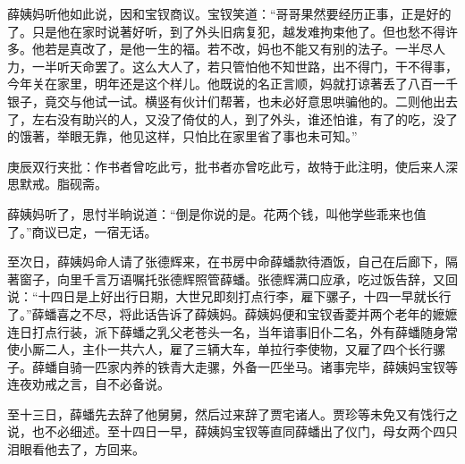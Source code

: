 \begin{parag}
    薛姨妈听他如此说，因和宝钗商议。宝钗笑道：“哥哥果然要经历正事，正是好的了。只是他在家时说著好听，到了外头旧病复犯，越发难拘束他了。但也愁不得许多。他若是真改了，是他一生的福。若不改，妈也不能又有别的法子。一半尽人力，一半听天命罢了。这么大人了，若只管怕他不知世路，出不得门，干不得事，今年关在家里，明年还是这个样儿。他既说的名正言顺，妈就打谅著丢了八百一千银子，竟交与他试一试。横竖有伙计们帮著，也未必好意思哄骗他的。二则他出去了，左右没有助兴的人，又没了倚仗的人，到了外头，谁还怕谁，有了的吃，没了的饿著，举眼无靠，他见这样，只怕比在家里省了事也未可知。”\begin{note}庚辰双行夹批：作书者曾吃此亏，批书者亦曾吃此亏，故特于此注明，使后来人深思默戒。脂砚斋。\end{note}薛姨妈听了，思忖半晌说道：“倒是你说的是。花两个钱，叫他学些乖来也值了。”商议已定，一宿无话。
\end{parag}


\begin{parag}
    至次日，薛姨妈命人请了张德辉来，在书房中命薛蟠款待酒饭，自己在后廊下，隔著窗子，向里千言万语嘱托张德辉照管薛蟠。张德辉满口应承，吃过饭告辞，又回说：“十四日是上好出行日期，大世兄即刻打点行李，雇下骡子，十四一早就长行了。”薛蟠喜之不尽，将此话告诉了薛姨妈。薛姨妈便和宝钗香菱并两个老年的嬷嬷连日打点行装，派下薛蟠之乳父老苍头一名，当年谙事旧仆二名，外有薛蟠随身常使小厮二人，主仆一共六人，雇了三辆大车，单拉行李使物，又雇了四个长行骡子。薛蟠自骑一匹家内养的铁青大走骡，外备一匹坐马。诸事完毕，薛姨妈宝钗等连夜劝戒之言，自不必备说。
\end{parag}


\begin{parag}
    至十三日，薛蟠先去辞了他舅舅，然后过来辞了贾宅诸人。贾珍等未免又有饯行之说，也不必细述。至十四日一早，薛姨妈宝钗等直同薛蟠出了仪门，母女两个四只泪眼看他去了，方回来。
\end{parag}


